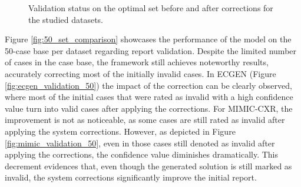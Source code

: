 \begin{figure}[t!]
    \centering
    \caption{Validation status on the optimal set before and after corrections for the studied datasets.}
    \label{fig:optimal_set_comparison}
\end{figure}


Figure \ref{fig:50_set_comparison} showcases the performance of the model on the 50-case base per dataset regarding report validation. Despite the limited number of cases in the case base, the framework still achieves noteworthy results, accurately correcting most of the initially invalid cases. In ECGEN (Figure \ref{fig:ecgen_validation_50}) the impact of the correction can be clearly observed, where most of the initial cases that were rated as invalid with a high confidence value turn into valid cases after applying the corrections. For MIMIC-CXR, the improvement is not as noticeable, as some cases are still rated as invalid after applying the system corrections. However, as depicted in Figure \ref{fig:mimic_validation_50}, even in those cases still denoted as invalid after applying the corrections, the confidence value diminishes dramatically. This decrement evidences that, even though the generated solution is still marked as invalid, the system corrections significantly improve the initial report.


